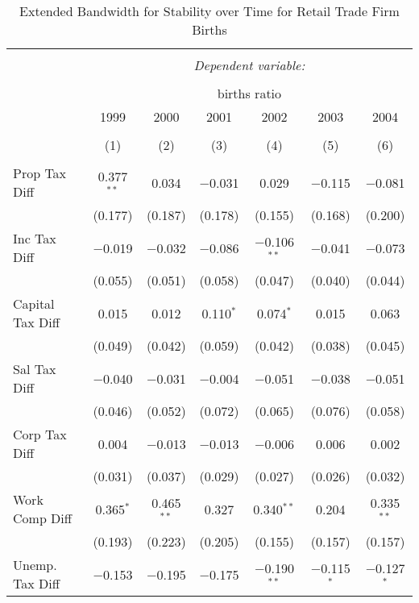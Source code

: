 
\begin{table}[!htbp] \centering 
  \caption{Extended Bandwidth for Stability over Time for  Retail Trade Firm Births} 
  \label{44-45 ebyear} 
\small 
\begin{tabular}{@{\extracolsep{5pt}}lcccccc} 
\\[-1.8ex]\hline 
\hline \\[-1.8ex] 
 & \multicolumn{6}{c}{\textit{Dependent variable:}} \\ 
\cline{2-7} 
\\[-1.8ex] & \multicolumn{6}{c}{births ratio} \\ 
 & 1999 & 2000 & 2001 & 2002 & 2003 & 2004 \\ 
\\[-1.8ex] & (1) & (2) & (3) & (4) & (5) & (6)\\ 
\hline \\[-1.8ex] 
 Prop Tax Diff & 0.377$^{**}$ & 0.034 & $-$0.031 & 0.029 & $-$0.115 & $-$0.081 \\ 
  & (0.177) & (0.187) & (0.178) & (0.155) & (0.168) & (0.200) \\ 
  Inc Tax Diff & $-$0.019 & $-$0.032 & $-$0.086 & $-$0.106$^{**}$ & $-$0.041 & $-$0.073 \\ 
  & (0.055) & (0.051) & (0.058) & (0.047) & (0.040) & (0.044) \\ 
  Capital Tax Diff & 0.015 & 0.012 & 0.110$^{*}$ & 0.074$^{*}$ & 0.015 & 0.063 \\ 
  & (0.049) & (0.042) & (0.059) & (0.042) & (0.038) & (0.045) \\ 
  Sal Tax Diff & $-$0.040 & $-$0.031 & $-$0.004 & $-$0.051 & $-$0.038 & $-$0.051 \\ 
  & (0.046) & (0.052) & (0.072) & (0.065) & (0.076) & (0.058) \\ 
  Corp Tax Diff & 0.004 & $-$0.013 & $-$0.013 & $-$0.006 & 0.006 & 0.002 \\ 
  & (0.031) & (0.037) & (0.029) & (0.027) & (0.026) & (0.032) \\ 
  Work Comp Diff & 0.365$^{*}$ & 0.465$^{**}$ & 0.327 & 0.340$^{**}$ & 0.204 & 0.335$^{**}$ \\ 
  & (0.193) & (0.223) & (0.205) & (0.155) & (0.157) & (0.157) \\ 
  Unemp. Tax Diff & $-$0.153 & $-$0.195 & $-$0.175 & $-$0.190$^{**}$ & $-$0.115$^{*}$ & $-$0.127$^{*}$ \\ 

\end{tabular}
\end{table}
